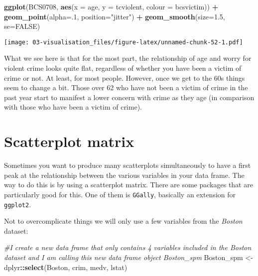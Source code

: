 \documentclass[
]{book}
\newenvironment{Shaded}{\begin{snugshade}}{\end{snugshade}}
\newcommand{\AttributeTok}[1]{\textcolor[rgb]{0.13,0.29,0.53}{#1}}
\newcommand{\CommentTok}[1]{\textcolor[rgb]{0.56,0.35,0.01}{\textit{#1}}}
\newcommand{\ConstantTok}[1]{\textcolor[rgb]{0.56,0.35,0.01}{#1}}
\newcommand{\DecValTok}[1]{\textcolor[rgb]{0.00,0.00,0.81}{#1}}
\newcommand{\FloatTok}[1]{\textcolor[rgb]{0.00,0.00,0.81}{#1}}
\newcommand{\FunctionTok}[1]{\textcolor[rgb]{0.13,0.29,0.53}{\textbf{#1}}}
\newcommand{\NormalTok}[1]{#1}
\newcommand{\OtherTok}[1]{\textcolor[rgb]{0.56,0.35,0.01}{#1}}
\newcommand{\SpecialCharTok}[1]{\textcolor[rgb]{0.81,0.36,0.00}{\textbf{#1}}}
\newcommand{\StringTok}[1]{\textcolor[rgb]{0.31,0.60,0.02}{#1}}
\begin{document}
\begin{Shaded}
\begin{Highlighting}[]
\FunctionTok{ggplot}\NormalTok{(BCS0708, }\FunctionTok{aes}\NormalTok{(}\AttributeTok{x =}\NormalTok{ age, }\AttributeTok{y =}\NormalTok{ tcviolent, }\AttributeTok{colour =}\NormalTok{ bcsvictim)) }\SpecialCharTok{+}
  \FunctionTok{geom\_point}\NormalTok{(}\AttributeTok{alpha=}\NormalTok{.}\DecValTok{1}\NormalTok{, }\AttributeTok{position=}\StringTok{"jitter"}\NormalTok{) }\SpecialCharTok{+}
  \FunctionTok{geom\_smooth}\NormalTok{(}\AttributeTok{size=}\FloatTok{1.5}\NormalTok{, }\AttributeTok{se=}\ConstantTok{FALSE}\NormalTok{)}
\end{Highlighting}
\end{Shaded}

\texttt{[image: 03-visualisation\_files/figure-latex/unnamed-chunk-52-1.pdf]}

What we see here is that for the most part, the relationship of age and worry for violent crime looks quite flat, regardless of whether you have been a victim of crime or not. At least, for most people. However, once we get to the 60s things seem to change a bit. Those over 62 who have not been a victim of crime in the past year start to manifest a lower concern with crime as they age (in comparison with those who have been a victim of crime).

\section{Scatterplot matrix}\label{scatterplot-matrix}

Sometimes you want to produce many scatterplots simultaneously to have a first peak at the relationship between the various variables in your data frame. The way to do this is by using a scatterplot matrix. There are some packages that are particularly good for this. One of them is \texttt{GGally}, basically an extension for \texttt{ggplot2}.

Not to overcomplicate things we will only use a few variables from the \emph{Boston} dataset:

\begin{Shaded}
\begin{Highlighting}[]
\CommentTok{\#I create a new data frame that only contains 4 variables included in the Boston dataset and I am calling this new data frame object Boston\_spm}
\NormalTok{Boston\_spm }\OtherTok{\textless{}{-}}\NormalTok{ dplyr}\SpecialCharTok{::}\FunctionTok{select}\NormalTok{(Boston, crim, medv, lstat)}
\end{Highlighting}
\end{Shaded}
\end{document}
